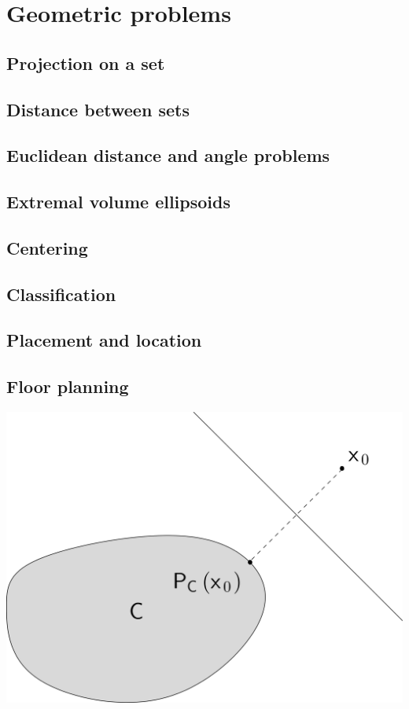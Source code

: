 \chapter{Geometric problems}

\clearpage
\section{Projection on a set}

\clearpage
\section{Distance between sets}

\clearpage
\section{Euclidean distance and angle problems}

\clearpage
\section{Extremal volume ellipsoids}

\clearpage
\section{Centering}

\clearpage
\section{Classification}

\clearpage
\section{Placement and location}

\clearpage
\section{Floor planning}


\clearpage
\hfil\includegraphics[width=.5\textwidth]{../Graphics/400.png}\hfil

